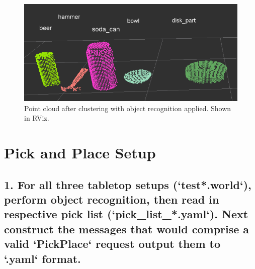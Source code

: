 \documentclass{article}
\begin{document}
\begin{figure}[H]
    \includegraphics[width=\linewidth]{classification.png}
    \caption{Point cloud after clustering with object recognition applied. Shown in RViz.}
    \label{fig:classification}
\end{figure}

\section{Pick and Place Setup}

\subsection{1. For all three tabletop setups (`test*.world`), perform object recognition, then read in respective pick list (`pick\_list\_*.yaml`). Next construct the messages that would comprise a valid `PickPlace` request output them to `.yaml` format.}


\end{document}
